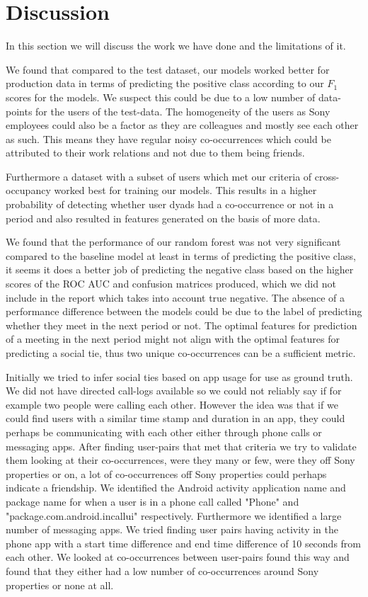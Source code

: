 \chapter{Discussion}
\label{chap:discussion}
In this section we will discuss the work we have done and the limitations of it.

We found that compared to the test dataset, our models worked better for production data in terms of predicting the positive class according to our $F_1$ scores for the models. We suspect this could be due to a low number of data-points for the users of the test-data. The homogeneity of the users as Sony employees could also be a factor as they are colleagues and mostly see each other as such. This means they have regular noisy co-occurrences which could be attributed to their work relations and not due to them being friends.

Furthermore a dataset with a subset of users which met our criteria of cross-occupancy worked best for training our models. This results in a higher probability of detecting whether user dyads had a co-occurrence or not in a period and also resulted in features generated on the basis of more data. 

We found that the performance of our random forest was not very significant compared to the baseline model at least in terms of predicting the positive class, it seems it does a better job of predicting the negative class based on the higher scores of the ROC AUC and confusion matrices produced, which we did not include in the report which takes into account true negative. The absence of a performance difference between the models could be due to the label of predicting whether they meet in the next period or not. The optimal features for prediction of a meeting in the next period might not align with the optimal features for predicting a social tie, thus two unique co-occurrences can be a sufficient metric. 

Initially we tried to infer social ties based on app usage for use as ground truth. We did not have directed call-logs available so we could not reliably say if for example two people were calling each other. However the idea was that if we could find users with a similar time stamp and duration in an app, they could perhaps be communicating with each other either through phone calls or messaging apps. After finding user-pairs that met that criteria we try to validate them looking at their co-occurrences, were they many or few, were they off Sony properties or on, a lot of co-occurrences off Sony properties could perhaps indicate a friendship. We identified the Android activity application name and package name for when a user is in a phone call called "Phone" and "package.com.android.incallui" respectively. Furthermore we identified a large number of messaging apps. We tried finding user pairs having activity in the phone app with a start time difference and end time difference of 10 seconds from each other. We looked at co-occurrences between user-pairs found this way and found that they either had a low number of co-occurrences around Sony properties or none at all.


